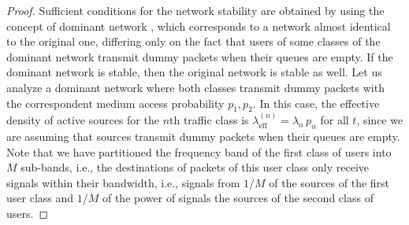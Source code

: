\begin{proof}
	Sufficient conditions for the network stability are obtained by using the concept of dominant network \cite[Section~2.1.2]{kompella2014stable}, which corresponds to a network almost identical to the original one, differing only on the fact that users of some classes of the dominant network transmit dummy packets when their queues are empty. If the dominant network is stable, then the original network is stable as well.
    Let us analyze a dominant network where both classes transmit dummy packets with the correspondent medium access probability $p_1, p_2$. In this case, the effective density of active sources for the $n$th traffic class is $\lambda_\mathrm{eff}^{(n)} = \lambda_n\,p_n$ for all $t$, since we are assuming that sources transmit dummy packets when their queues are empty.
    Note that we have partitioned the frequency band of the first class of users into $M$ sub-bands, i.e., the destinations of packets of this user class only receive signals within their bandwidth, i.e., signals from $1/M$ of the sources of the first user class and $1/M$ of the power of signals the sources of the second class of users.


\end{proof}
